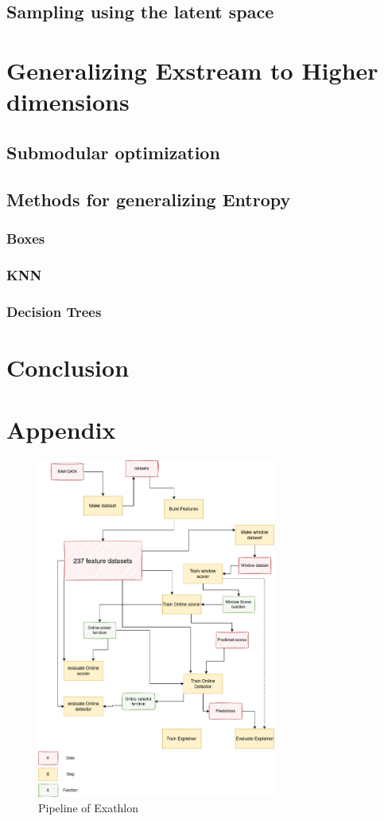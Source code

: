 \documentclass[oneside, a4paper, onecolumn, 11pt]{article}
\begin{document}
\subsection{Sampling using the latent space}

\section{Generalizing Exstream to Higher dimensions}
\subsection{Submodular optimization}
\subsection{Methods for generalizing Entropy}
\subsubsection{Boxes}
\subsubsection{KNN}
\subsubsection{Decision Trees}
\section{Conclusion}

\newpage



\newpage
\appendix

\section{Appendix}
\label{sec:appendix}


\begin{figure}[h]
    \centering
    \includegraphics[width=0.7\textwidth]{images/pipeline.drawio.png} %
    \caption{Pipeline of Exathlon}
    \label{fig:pipeline}
\end{figure}
\end{document}
